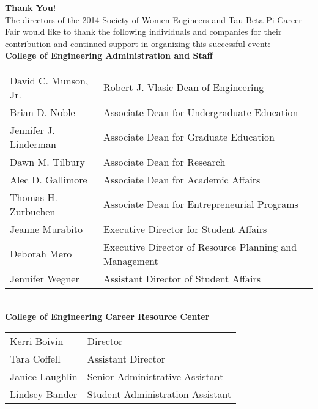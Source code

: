 \documentclass[twoside]{article}
\begin{document}
    \startforewardsection
    { \fontsize{16}{19}\selectfont \bf Thank You!}\\The directors of the 2014 Society of Women Engineers 
    and Tau Beta Pi Career Fair would like to thank the following individuals and 
    companies for their contribution and continued support in organizing this 
    successful event:\\
    
    { \fontsize{14}{17}\selectfont \bf College of Engineering Administration and Staff}\\\begin{tabular}{p{2in}l}
    David C. Munson, Jr.	&	Robert J. Vlasic Dean of Engineering\\
        Brian D. Noble	&	Associate Dean for Undergraduate Education\\
        Jennifer J. Linderman	&	Associate Dean for Graduate Education\\
        Dawn M. Tilbury	&	Associate Dean for Research\\
        Alec D. Gallimore	&	Associate Dean for Academic Affairs\\
        Thomas H. Zurbuchen	&	Associate Dean for Entrepreneurial Programs\\
        Jeanne  Murabito	&	Executive Director for Student Affairs\\
        Deborah Mero	&	Executive Director of Resource Planning and Management\\
        Jennifer Wegner	&	Assistant Director of Student Affairs\\
        \end{tabular}\\[1em]
    
    { \fontsize{14}{17}\selectfont \bf College of Engineering Career Resource Center}\\\begin{tabular}{p{2in}l}
    Kerri Boivin	&	Director\\
        Tara Coffell	&	Assistant Director\\
        Janice Laughlin	&	Senior Administrative Assistant\\
        Lindsey Bander	&	Student Administration Assistant\\
        \end{tabular}\\[1em]
    
\end{document}
